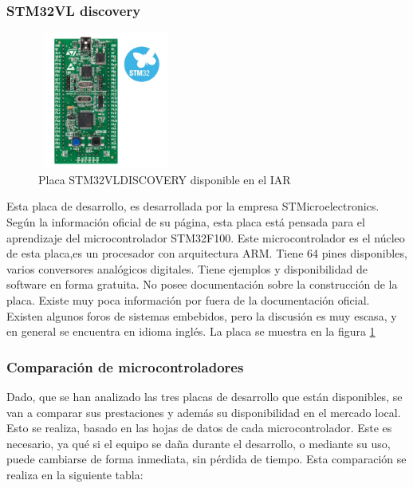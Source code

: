 \subsubsection{STM32VL discovery}

\begin{figure}
	\includegraphics[width=0.4\textwidth,height=45mm] {stm32vl}
	\caption{Placa STM32VLDISCOVERY disponible en el IAR}
	\label{fig:stm32}
\end{figure}

Esta placa de desarrollo, es desarrollada por la empresa STMicroelectronics. Según la información oficial de su página, esta placa está pensada para el aprendizaje del microcontrolador STM32F100. Este microcontrolador es el núcleo de esta placa,es un procesador con arquitectura ARM. Tiene 64 pines disponibles, varios conversores analógicos digitales. Tiene ejemplos y disponibilidad de software en forma gratuita. No posee documentación sobre la construcción de la placa. Existe muy poca información por fuera de la documentación oficial. Existen algunos foros de sistemas embebidos, pero la discusión es muy escasa, y en general se encuentra en idioma inglés. La placa se muestra en la figura \ref{fig:stm32}




\subsubsection{Comparación de microcontroladores} 
Dado, que se han analizado las tres placas de desarrollo que están disponibles, se van a comparar sus prestaciones y además su disponibilidad en el mercado local. Esto se realiza, basado en las hojas de datos de cada microcontrolador. Este es necesario, ya qué si el equipo se daña durante el desarrollo, o mediante su uso, puede cambiarse de forma inmediata, sin pérdida de tiempo. Esta comparación se realiza en la siguiente tabla:  

